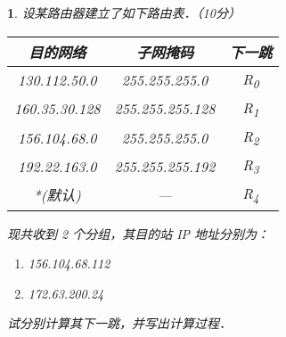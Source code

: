 \documentclass{ctexart}
\theoremstyle{change}
\newtheorem{ti}{}[section]
\begin{document}
\begin{ti}
	设某路由器建立了如下路由表．（10分）
	\begin{center}
		\begin{tabular}{|c|c|c|}
			\hline
			目的网络 & 子网掩码 & 下一跳 \\
			\hline
			130.112.50.0 & 255.255.255.0 & R\textsubscript{0} \\
			\hline
			160.35.30.128 & 255.255.255.128 & R\textsubscript{1} \\
			\hline
			156.104.68.0 & 255.255.255.0 & R\textsubscript{2} \\
			\hline
			192.22.163.0 & 255.255.255.192 & R\textsubscript{3} \\
			\hline
			*(默认) & --- & R\textsubscript{4} \\
			\hline
		\end{tabular}
	\end{center}
	现共收到 2 个分组，其目的站 IP 地址分别为：
	\begin{enumerate}
		\item 156.104.68.112
		\item 172.63.200.24
	\end{enumerate}
	试分别计算其下一跳，并写出计算过程．
\end{ti}
\end{document}
